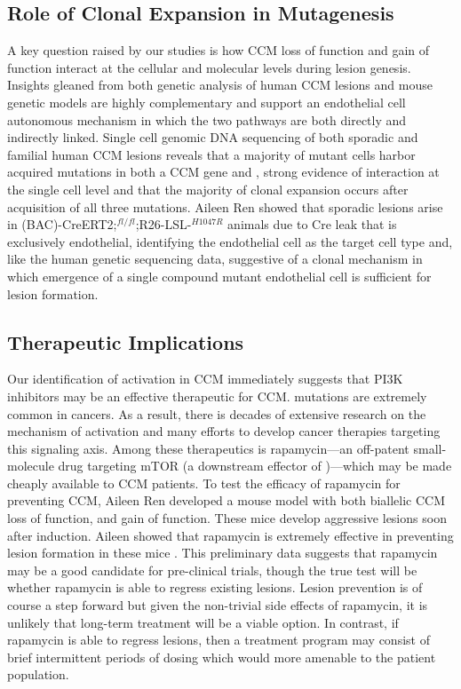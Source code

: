 \subsection{Role of Clonal Expansion in Mutagenesis}
A key question raised by our studies is how CCM loss of function and  gain of function interact at the cellular and molecular levels during lesion genesis. Insights gleaned from both genetic analysis of human CCM lesions and mouse genetic models are highly complementary and support an endothelial cell autonomous mechanism in which the two pathways are both directly and indirectly linked. Single cell genomic DNA sequencing of both sporadic and familial human CCM lesions reveals that a majority of mutant cells harbor acquired mutations in both a CCM gene and , strong evidence of interaction at the single cell level and that the majority of clonal expansion occurs after acquisition of all three mutations. Aileen Ren showed that sporadic lesions arise in (BAC)-CreERT2;$^{fl/fl}$;R26-LSL-$^{H1047R}$ animals due to Cre leak that is exclusively endothelial, identifying the endothelial cell as the target cell type and, like the human genetic sequencing data, suggestive of a clonal mechanism in which emergence of a single compound mutant endothelial cell is sufficient for lesion formation.

\subsection{Therapeutic Implications}
Our identification of  activation in CCM immediately suggests that PI3K inhibitors may be an effective therapeutic for CCM.  mutations are extremely common in cancers. As a result, there is decades of extensive research on the mechanism of  activation and many efforts to develop cancer therapies targeting this signaling axis. Among these therapeutics is rapamycin---an off-patent small-molecule drug targeting mTOR (a downstream effector of )---which may be made cheaply available to CCM patients. To test the efficacy of rapamycin for preventing CCM, Aileen Ren developed a mouse model with both biallelic CCM loss of function, and  gain of function. These mice develop aggressive lesions soon after induction. Aileen showed that rapamycin is extremely effective in preventing lesion formation in these mice \citep{ren2021}. This preliminary data suggests that rapamycin may be a good candidate for pre-clinical trials, though the true test will be whether rapamycin is able to regress existing lesions. Lesion prevention is of course a step forward but given the non-trivial side effects of rapamycin, it is unlikely that long-term treatment will be a viable option. In contrast, if rapamycin is able to regress lesions, then a treatment program may consist of brief intermittent periods of dosing which would more amenable to the patient population. 

